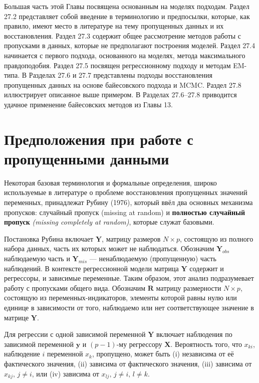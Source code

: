 Большая часть этой Главы посвящена основанным на моделях подходам. Раздел 27.2 представляет собой введение в терминологию и предпосылки, которые, как правило, имеют место в литературе на тему пропущенных данных и их восстановления. Раздел 27.3 содержит общее рассмотрение методов работы с пропусками в данных, которые не предполагают построения моделей. Раздел 27.4 начинается с первого подхода, основанного на моделях, метода максимального правдоподобия. Раздел 27.5 посвящен регрессионному подходу и методам EM-типа. В Разделах 27.6 и 27.7 представлены подходы восстановления пропущенных данных на основе байесовского подхода и MCMC. Раздел 27.8 иллюстрирует описанное выше примером. В Разделах 27.6--27.8 приводится удачное  применение байесовских методов из Главы 13.

\section{Предположения при работе с пропущенными данными}

Некоторая базовая терминология и формальные определения, широко используемые в литературе о проблеме восстановления пропущенных значений переменных, принадлежат Рубину (1976), который ввёл два основных механизма пропусков: случайный пропуск (missing at random) и {\bf полностью случайный пропуск} \emph{(missing completely at random)}, которые служат базовыми. 

Постановка Рубина включает $\mathbf{Y}$, матрицу размеров $N \times p$, состоящую из полного набора данных, часть их которых может не наблюдаться. Обозначим $\mathbf{Y}_{obs}$ наблюдаемую часть и $\mathbf{Y}_{mis}$ --- ненаблюдаемую (пропущенную) часть наблюдений. В контексте регрессионной модели матрица $\mathbf{Y}$ содержит и регрессоры, и зависимые переменные. Таким образом, этот анализ подразумевает работу с пропусками общего вида. Обозначим $\mathbf{R}$ матрицу размерности $N \times p$, состоящую из переменных-индикаторов, элементы которой равны нулю или единице в зависимости от того, наблюдаемо или нет соответствующее значение в матрице $\mathbf{Y}$.

Для регрессии с одной зависимой переменной $\mathbf{Y}$ включает наблюдения по зависимой переменной  $\mathbf{y}$ и $(p-1)$-му регрессору $\mathbf{X}$. Вероятность того, что $x_{ki}$, наблюдение $i$ переменной $x_k$, пропущено, может быть (i) независима от её фактического  значения, (ii) зависима от фактического значения, (iii) зависима от $x_{kj}, \, j \neq i$, или (iv) зависима от $x_{lj}, \, j \neq i, \, l \neq k$.

